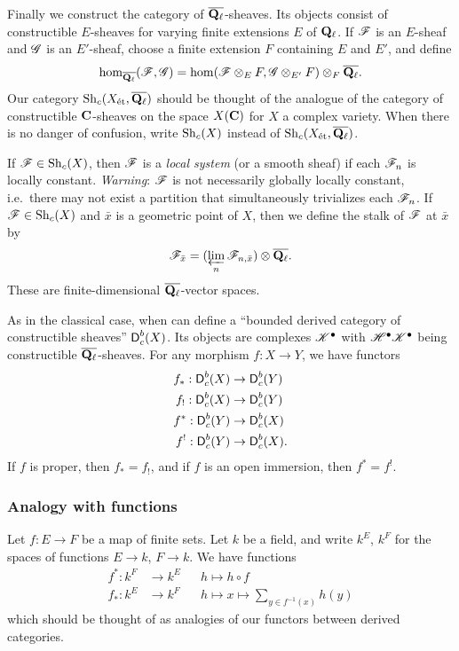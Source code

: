 Finally we construct the category of $\overline{\mathbf{Q}_\ell}$-sheaves. Its 
objects consist of constructible $E$-sheaves for varying finite extensions $E$ of 
$\mathbf{Q}_\ell$. If $\mathscr{F}$ is an $E$-sheaf and $\mathscr{G}$ is an $E'$-sheaf, choose a finite 
extension $F$ containing $E$ and $E'$, and define 
\[
  \hom_{\overline{\mathbf{Q}_\ell}}(\mathscr{F},\mathscr{G}) = \hom(\mathscr{F}\otimes_E F,\mathscr{G}\otimes_{E'} F)\otimes_F \overline{\mathbf{Q}_\ell} .
\]
Our category $\operatorname{Sh}_c(X_{\textnormal{\'et}},\overline{\mathbf{Q}_\ell})$ should be thought of the 
analogue of the category of constructible $\mathbf{C}$-sheaves on the space $X(\mathbf{C})$ for 
$X$ a complex variety. When there is no danger of confusion, write $\operatorname{Sh}_c(X)$ 
instead of $\operatorname{Sh}_c(X_{\textnormal{\'et}},\overline{\mathbf{Q}_\ell})$. 

If $\mathscr{F}\in \operatorname{Sh}_c(X)$, then $\mathscr{F}$ is a \emph{local system} (or a smooth sheaf) if 
each $\mathscr{F}_n$ is locally constant. \emph{Warning}: $\mathscr{F}$ is not necessarily globally 
locally constant, i.e.\ there may not exist a partition that simultaneously 
trivializes each $\mathscr{F}_n$. If $\mathscr{F}\in \operatorname{Sh}_c(X)$ and $\bar x$ is a geometric point 
of $X$, then we define the stalk of $\mathscr{F}$ at $\bar x$ by 
\[
  \mathscr{F}_{\bar x} = (\varprojlim_n \mathscr{F}_{n,\bar x})\otimes \overline{\mathbf{Q}_\ell} .
\]
These are finite-dimensional $\overline{\mathbf{Q}_\ell}$-vector spaces. 

As in the classical case, when can define a ``bounded derived category of 
constructible sheaves'' $\operatorname{\mathsf{D}}_c^b(X)$. Its objects are complexes 
$\mathscr{K}^\bullet$ with $\mathscr{H}^\bullet\mathscr{K}^\bullet$ being constructible 
$\overline{\mathbf{Q}_\ell}$-sheaves. 
For any morphism $f:X\to Y$, we have functors 
\begin{align*}
  f_\ast:\operatorname{\mathsf{D}}_c^b(X) &\to \operatorname{\mathsf{D}}_c^b(Y) \\
  f_! : \operatorname{\mathsf{D}}_c^b(X) &\to \operatorname{\mathsf{D}}_c^b(Y) \\
  f^\ast : \operatorname{\mathsf{D}}_c^b(Y) &\to \operatorname{\mathsf{D}}_c^b(X) \\
  f^!:\operatorname{\mathsf{D}}_c^b(Y) &\to \operatorname{\mathsf{D}}_c^b(X) .
\end{align*}
If $f$ is proper, then $f_\ast=f_!$, and if $f$ is an open immersion, then 
$f^\ast=f^!$. 


\subsubsection{Analogy with functions}

Let $f:E\to F$ be a map of finite sets. Let $k$ be a field, and write 
$k^E$, $k^F$ for the spaces of functions $E\to k$, $F\to k$. We have functions 
\begin{align*}
  f^\ast:k^F &\to k^E && h\mapsto h\circ f \\
  f_\ast:k^E &\to k^F && h\mapsto x\mapsto \sum_{y\in f^{-1}(x)} h(y)
\end{align*}
which should be thought of as analogies of our functors between derived 
categories. 


